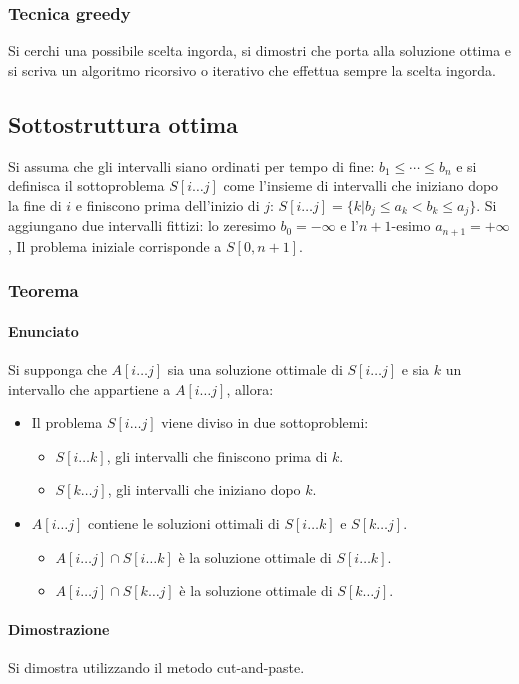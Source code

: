		\subsubsection{Tecnica greedy}
		Si cerchi una possibile scelta ingorda, si dimostri che porta alla soluzione ottima e si scriva un algoritmo ricorsivo o iterativo che effettua sempre la scelta ingorda.
		\subsection{Sottostruttura ottima}
		Si assuma che gli intervalli siano ordinati per tempo di fine: $b_1\le \cdots\le b_n$ e si definisca il sottoproblema $S[i\dots j]$ come l'insieme di intervalli che iniziano dopo la fine
		di $i$ e finiscono prima dell'inizio di $j$: $S[i\dots j] = \{k|b_j\le a_k < b_k\le a_j\}$. Si aggiungano due intervalli fittizi: lo zeresimo $b_0=-\infty$ e l'$n+1$-esimo 
		$a_{n+1} = +\infty$, Il problema iniziale corrisponde a $S[0, n+1]$. 
		\subsubsection{Teorema}
		\paragraph{Enunciato}
		Si supponga che $A[i\dots j]$ sia una soluzione ottimale di $S[i\dots j]$ e sia $k$ un intervallo che appartiene a $A[i\dots j]$, allora:
		\begin{itemize}
			\item Il problema $S[i\dots j]$ viene diviso in due sottoproblemi:
				\begin{itemize}
					\item $S[i\dots k]$, gli intervalli che finiscono prima di $k$.
					\item $S[k\dots j]$, gli intervalli che iniziano dopo $k$.
				\end{itemize}
			\item $A[i\dots j]$ contiene le soluzioni ottimali di $S[i\dots k]$ e $S[k\dots j]$.
				\begin{itemize}
					\item $A[i\dots j]\cap S[i\dots k]$ \`e la soluzione ottimale di $S[i\dots k]$.
					\item $A[i\dots j]\cap S[k\dots j]$ \`e la soluzione ottimale di $S[k\dots j]$.
				\end{itemize}
		\end{itemize}
		\paragraph{Dimostrazione}
		Si dimostra utilizzando il metodo cut-and-paste.
